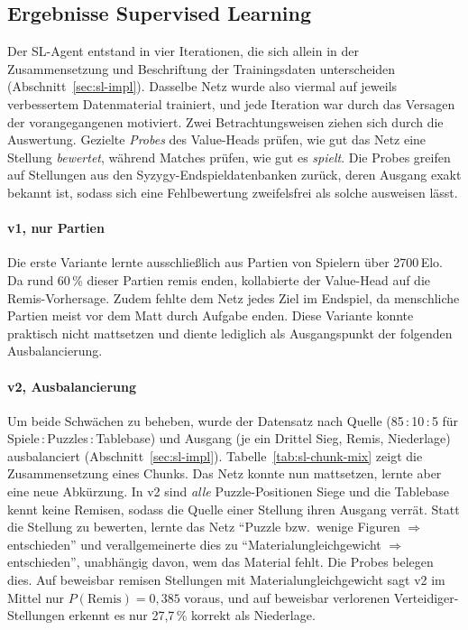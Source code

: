 \documentclass[
  a4paper, 12pt,
  parskip=half,
  headings=small,
  bibliography=totoc
]{scrartcl}
\begin{document}
\subsection{Ergebnisse Supervised Learning}\label{sec:sl-results}
Der SL-Agent entstand in vier Iterationen, die sich allein in
der Zusammensetzung und Beschriftung der Trainingsdaten unterscheiden
(Abschnitt~\ref{sec:sl-impl}). Dasselbe Netz wurde also viermal auf jeweils
verbessertem Datenmaterial trainiert, und jede Iteration war durch das Versagen
der vorangegangenen motiviert. Zwei Betrachtungsweisen ziehen sich durch die
Auswertung. Gezielte \emph{Probes} des Value-Heads prüfen, wie gut das Netz eine
Stellung \emph{bewertet}, während Matches prüfen, wie gut es \emph{spielt}. Die
Probes greifen auf Stellungen aus den Syzygy-Endspieldatenbanken zurück, deren
Ausgang exakt bekannt ist, sodass sich eine Fehlbewertung zweifelsfrei als solche
ausweisen lässt.

\paragraph{v1, nur Partien}
Die erste Variante lernte ausschließlich aus Partien von Spielern über
2700\,Elo. Da rund 60\,\% dieser Partien remis enden, kollabierte der Value-Head
auf die Remis-Vorhersage. Zudem fehlte dem Netz jedes Ziel im Endspiel, da
menschliche Partien meist vor dem Matt durch Aufgabe enden. Diese Variante konnte
praktisch nicht mattsetzen und diente lediglich als Ausgangspunkt der folgenden
Ausbalancierung.

\paragraph{v2, Ausbalancierung}
Um beide Schwächen zu beheben, wurde der Datensatz nach Quelle (85\,:\,10\,:\,5
für Spiele\,:\,Puzzles\,:\,Tablebase) und Ausgang (je ein Drittel Sieg, Remis,
Niederlage) ausbalanciert (Abschnitt~\ref{sec:sl-impl}).
Tabelle~\ref{tab:sl-chunk-mix} zeigt die Zusammensetzung eines Chunks. Das Netz
konnte nun mattsetzen, lernte aber eine neue Abkürzung. In v2 sind \emph{alle}
Puzzle-Positionen Siege und die Tablebase kennt keine Remisen, sodass die Quelle
einer Stellung ihren Ausgang verrät. Statt die Stellung zu bewerten, lernte das
Netz \enquote{Puzzle bzw.\ wenige Figuren \(\Rightarrow\) entschieden} und
verallgemeinerte dies zu \enquote{Materialungleichgewicht \(\Rightarrow\)
entschieden}, unabhängig davon, wem das Material fehlt. Die Probes belegen dies.
Auf beweisbar remisen Stellungen mit
Materialungleichgewicht sagt v2 im Mittel nur \(P(\text{Remis}) = 0{,}385\)
voraus, und auf beweisbar verlorenen Verteidiger-Stellungen erkennt es nur
27{,}7\,\% korrekt als Niederlage.
\end{document}
